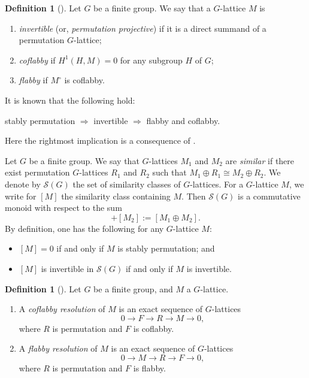 \documentclass[12pt]{amsart}
\theoremstyle{plain}
\theoremstyle{definition}
\newtheorem{dfn}[thm]{Definition}
\numberwithin{thm}{section}
\numberwithin{equation}{section}
\newcommand{\sS}{\mathscr{S}}
\begin{document}
\begin{dfn}[{\cite[\S\S 2.3--2.5]{Lorenz2005}}]
Let $G$ be a finite group. We say that a $G$-lattice $M$ is
\begin{enumerate}
\item \emph{invertible} (or, \emph{permutation projective}) if it is a direct summand of a permutation $G$-lattice;
\item \emph{coflabby} if $H^{1}(H,M)=0$ for any subgroup $H$ of $G$;
\item \emph{flabby} if $M^{\circ}$ is coflabby. 
\end{enumerate}
\end{dfn}

It is known that the following hold: 
\begin{center}
    stably permutation $\Rightarrow$ invertible $\Rightarrow$ flabby and coflabby. 
\end{center}
Here the rightmost implication is a consequence of \cite[(1.2) Proposition]{Lenstra1974}. 

\vspace{6pt}
Let $G$ be a finite group. We say that $G$-lattices $M_{1}$ and $M_{2}$ are \emph{similar} if there exist permutation $G$-lattices $R_{1}$ and $R_{2}$ such that $M_{1}\oplus R_{1}\cong M_{2}\oplus R_{2}$. We denote by $\sS(G)$ the set of similarity classes of $G$-lattices. For a $G$-lattice $M$, we write for $[M]$ the similarity class containing $M$. Then $\sS(G)$ is a commutative monoid with respect to the sum
\begin{equation*}
    [M_{1}]+[M_{2}]:=[M_{1}\oplus M_{2}]. 
\end{equation*}
By definition, one has the following for any $G$-lattice $M$: 
\begin{itemize}
    \item $[M]=0$ if and only if $M$ is stably permutation; and
    \item $[M]$ is invertible in $\sS(G)$ if and only if $M$ is invertible. 
\end{itemize}

\begin{dfn}[{\cite[\S 2.6]{Lorenz2005}}]
Let $G$ be a finite group, and $M$ a $G$-lattice. 
\begin{enumerate}
\item A \emph{coflabby resolution} of $M$ is an exact sequence of $G$-lattices
\begin{equation*}
0\rightarrow F \rightarrow R \rightarrow M \rightarrow 0, 
\end{equation*}
where $R$ is permutation and $F$ is coflabby. 
\item A \emph{flabby resolution} of $M$ is an exact sequence of $G$-lattices
\begin{equation*}
0\rightarrow M \rightarrow R \rightarrow F \rightarrow 0, 
\end{equation*}
where $R$ is permutation and $F$ is flabby. 
\end{enumerate}
\end{dfn}
\end{document}
